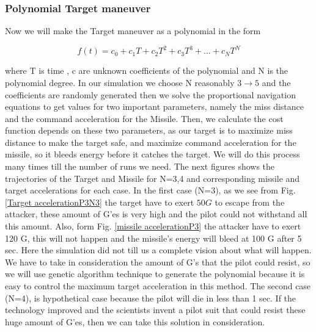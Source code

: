 
\subsubsection{Polynomial Target maneuver}
Now we will make the Target maneuver as a polynomial in the form

\begin{equation}
f(t) = c_0 + c_1 T + c_2 T^2 + c_3 T^3 + ... + c_N T^N
\end{equation} 

where T is time , c are unknown coefficients of the polynomial and N is the polynomial degree.
In our simulation we choose N reasonably $3\to5$ and the coefficients are randomly generated then we solve the proportional navigation equations to get values for two important parameters, namely the miss distance and the command acceleration for the Missile. Then, we calculate the cost function depends on these two parameters, as our target is to maximize miss distance to make the target safe, and maximize command acceleration for the missile, so it bleeds energy before it catches the target. We will do this process many times till the number of runs we need. The next figures shows the trajectories of the Target and Missile for N=3,4 and corresponding missile and target accelerations for each case.
In the first case (N=3), as we see from Fig. \ref{Target accelerationP3N3} the target have to exert $50 G$ to escape from the attacker, these amount of G'es is very high and the pilot could not withstand all this amount. Also, form Fig. \ref{missile accelerationP3} the attacker have to exert 120 G, this will not happen and the missile's energy will bleed at 100 G after 5 sec. Here the simulation did not till us a complete vision about what will happen. We have to take in consideration the amount of G's that the pilot could resist, so we will use genetic algorithm technique to generate the polynomial because it is easy to control the maximum target acceleration in this method.
The second case (N=4), is hypothetical case because the pilot will die in less than 1 sec. If the technology improved and the scientists invent a pilot suit that could resist these huge amount of G'es, then we can take this solution in consideration.        

